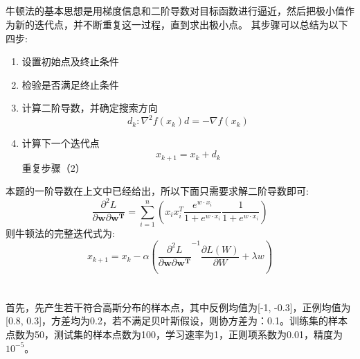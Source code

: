 \documentclass[lang=cn,a4paper,cite=authoryear]{elegantpaper}
\begin{document}
\subsection*{}
牛顿法的基本思想是用梯度信息和二阶导数对目标函数进行逼近，然后把极小值作为新的迭代点，并不断重复这一过程，直到求出极小点。
其步骤可以总结为以下四步:
\begin{enumerate}[(1)]
	\item 设置初始点及终止条件
	\item 检验是否满足终止条件
	\item 计算二阶导数，并确定搜索方向
	$$
	d_{k}: \nabla^{2} f\left(x_{k}\right) d=-\nabla f\left(x_{k}\right)
	$$
	\item 计算下一个迭代点
	$$
	x_{k+1}=x_{k}+d_{k}
	$$
	重复步骤（2）
\end{enumerate}
本题的一阶导数在上文中已经给出，所以下面只需要求解二阶导数即可:
$$
\frac{\partial ^2L}{\partial \mathbf{w}\partial \mathbf{w}^{\mathbf{T}}}=\sum_{i=1}^n{\left( x_ix_{i}^{T}\frac{e^{w\cdot x_i}}{1+e^{w\cdot x_i}}\frac{1}{1+e^{w\cdot x_i}} \right)}
$$
则牛顿法的完整迭代式为:
$$
x_{k+1}=x_k-\alpha \left( \frac{\partial ^2L}{\partial \mathbf{w}\partial \mathbf{w}^{\mathbf{T}}}^{-1}\frac{\partial L\left( W \right)}{\partial W}+\lambda w \right) 
$$
\section*{}
\subsection*{}
首先，先产生若干符合高斯分布的样本点，其中反例均值为[-1, -0.3]，正例均值为[0.8, 0.3]，方差均为0.2，若不满足贝叶斯假设，则协方差为：0.1。训练集的样本点数为50，测试集的样本点数为100，学习速率为1，正则项系数为0.01，精度为$10^{-5}$。

\subsection*{}
\end{document}
